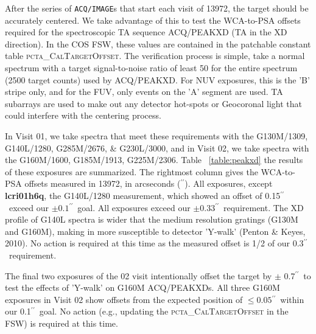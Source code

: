 \documentclass[12pt]{reportj}
\def\arcsec{\hbox{$^{\prime\prime}$}}
\begin{document}
After the series of \texttt{ACQ/IMAGE}s that start each visit of 13972, the target should be accurately
centered. We take advantage of this to test the WCA-to-PSA offsets required for the spectroscopic
TA sequence ACQ/PEAKXD (TA in the XD direction). In the COS FSW, these values are contained in the
patchable constant table \textsc{pcta\_CalTargetOffset}. The verification process is simple, take a normal
spectrum with a target signal-to-noise ratio of least 50 for the entire spectrum (2500 target counts)
used by ACQ/PEAKXD. For NUV exposures, this is the 'B' stripe only, and for the FUV, only events on the
'A' segment are used. TA subarrays are used to make out any detector hot-spots or Geocoronal light that
could interfere with the centering process.

In Visit 01, we take spectra that meet these requirements with the G130M/1309, G140L/1280, G285M/2676, \& G230L/3000, and in Visit 02,
we take spectra with the G160M/1600, G185M/1913, G225M/2306. Table ~\ref{table:peakxd} the results of these exposures are summarized.
The rightmost column gives the WCA-to-PSA offsets measured in 13972, in arcseconds (\arcsec).
All exposures, except {\bf lcri01h6q}, the G140L/1280 measurement, which showed an offset of 0.15\arcsec\ exceed our $\pm 0.1$\arcsec\ goal.
All exposures exceed our $\pm 0.33$\arcsec\ requirement. The XD profile of G140L spectra is wider that the medium
resolution gratings (G130M and G160M), making in more susceptible to detector 'Y-walk' (Penton \& Keyes, 2010).
No action is required at this time as the measured offset is 1/2 of our 0.3\arcsec\ requirement.

The final two exposures of the 02 visit intentionally offset the target by $\pm$ 0.7\arcsec\ to test the effects
of 'Y-walk' on G160M ACQ/PEAKXDs. All three G160M exposures in Visit 02 show offsets from the expected position
of $\le 0.05$\arcsec\ within our 0.1\arcsec\ goal. No action (e.g., updating the \textsc{pcta\_CalTargetOffset} in the FSW)
is required at this time.
%
\clearpage
%
%
%
\end{document}
